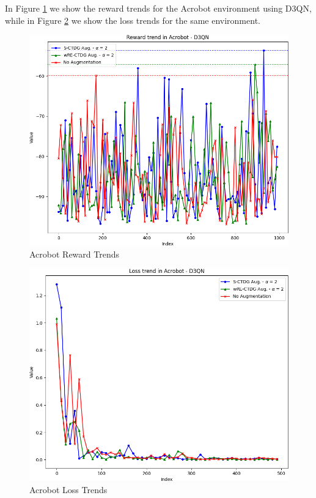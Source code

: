 In Figure \ref{fig:rew_acrobot} we show the reward trends for the
Acrobot environment using D3QN, while in Figure \ref{fig:loss_acrobot}
we show the loss trends for the same environment.

\begin{figure}[h]
    \centering
    \includegraphics[width=.8\textwidth]{figures/ch5/rew_acrobot.png}
    \caption{Acrobot Reward Trends}
    \label{fig:rew_acrobot}
\end{figure}

\begin{figure}[h]
    \centering
    \includegraphics[width=.8\textwidth]{figures/ch5/loss_acrobot.png}
    \caption{Acrobot Loss Trends}
    \label{fig:loss_acrobot}
\end{figure}

